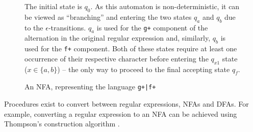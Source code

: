 \documentclass[a4paper,openany,12pt]{book}
\begin{document}
\begin{figure}
    \begin{MyMdframed}
    \vspace{0.5em}


\caption{\label{figure:nfa:1} An NFA, representing the language \texttt{g+|f+}}
\vspace{0.5em}
\captionsetup{style=default}


\vspace{0.5em}

The initial state is $q_0$.
As this automaton is non-deterministic, it can be viewed as ``branching'' and entering the two states $q_a$ and $q_b$
due to the $\epsilon$-transitions.
$q_a$ is used for the \texttt{g+} component of the alternation in the original regular expression and, similarly, $q_b$
is used for the \texttt{f+} component.
Both of these states require at least one occurrence of their respective character before entering the $q_{x1}$ state
($x \in \{a, b\}$) -- the only way to proceed to the final accepting state $q_f$.

\vspace{0.5em}

\end{MyMdframed}
\end{figure}

Procedures exist to convert between regular expressions, NFAs and DFAs.
For example, converting a regular expression to an NFA can be achieved using Thompson's construction algorithm \citep[p.~152]{aho1986compilers}.
\end{document}
